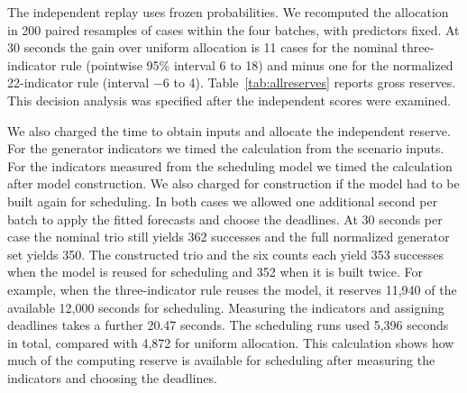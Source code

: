 \documentclass[11pt,a4paper]{article}
\begin{document}
The independent replay uses frozen probabilities. We recomputed the allocation in 200 paired resamples of cases within the four batches, with predictors fixed. At 30 seconds the gain over uniform allocation is 11 cases for the nominal three-indicator rule (pointwise 95\% interval 6 to 18) and minus one for the normalized 22-indicator rule (interval $-6$ to 4). Table~\ref{tab:allreserves} reports gross reserves. This decision analysis was specified after the independent scores were examined.

We also charged the time to obtain inputs and allocate the independent reserve. For the generator indicators we timed the calculation from the scenario inputs. For the indicators measured from the scheduling model we timed the calculation after model construction. We also charged for construction if the model had to be built again for scheduling. In both cases we allowed one additional second per batch to apply the fitted forecasts and choose the deadlines. At 30 seconds per case the nominal trio still yields 362 successes and the full normalized generator set yields 350. The constructed trio and the six counts each yield 353 successes when the model is reused for scheduling and 352 when it is built twice. For example, when the three-indicator rule reuses the model, it reserves 11,940 of the available 12,000 seconds for scheduling. Measuring the indicators and assigning deadlines takes a further 20.47 seconds. The scheduling runs used 5,396 seconds in total, compared with 4,872 for uniform allocation. This calculation shows how much of the computing reserve is available for scheduling after measuring the indicators and choosing the deadlines.
\end{document}
